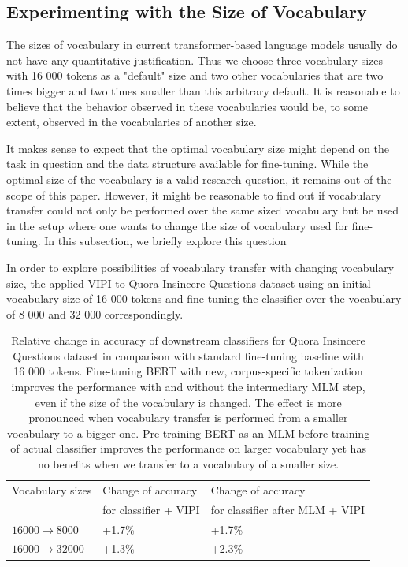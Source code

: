 \documentclass[review]{elsarticle}
\begin{document}
\subsection{Experimenting with the Size of Vocabulary}

 The sizes of vocabulary in current transformer-based language models usually do not have any quantitative justification. Thus we choose three vocabulary sizes with 16 000 tokens as a "default" size and two other vocabularies that are two times bigger and two times smaller than this arbitrary default. It is reasonable to believe that the behavior observed in these vocabularies would be, to some extent, observed in the vocabularies of another size. 
 
 It makes sense to expect that the optimal vocabulary size might depend on the task in question and the data structure available for fine-tuning. While the optimal size of the vocabulary is a valid research question, it remains out of the scope of this paper. However, it might be reasonable to find out if vocabulary transfer could not only be performed over the same sized vocabulary but be used in the setup where one wants to change the size of vocabulary used for fine-tuning. In this subsection, we briefly explore this question

In order to explore possibilities of vocabulary transfer with changing vocabulary size, the applied VIPI to Quora Insincere Questions dataset using an initial vocabulary size of 16 000 tokens and fine-tuning the classifier over the vocabulary of 8 000 and 32 000 correspondingly. 

\begin{table}[h]
\centering
\begin{tabular}{lll}
Vocabulary sizes & Change of accuracy & Change of accuracy \\
                 & for classifier + VIPI& for classifier after MLM + VIPI\\
\hline
$16 000 \rightarrow 8 000$ & +1.7\%& +1.7\%\\
$16 000 \rightarrow 32 000$ & +1.3\% &+2.3\%\\
\hline
\end{tabular}
\caption{Relative change in accuracy of downstream classifiers for Quora  Insincere Questions dataset in comparison with standard fine-tuning baseline with 16 000 tokens. Fine-tuning BERT with new, corpus-specific tokenization improves the performance with and without the intermediary MLM step, even if the size of the vocabulary is changed. The effect is more pronounced when vocabulary transfer is performed from a smaller vocabulary to a bigger one. Pre-training BERT as an MLM before training of actual classifier improves the performance on larger vocabulary yet has no benefits when we transfer to a vocabulary of a smaller size.}
\label{tab:16832}
\end{table}
\end{document}
